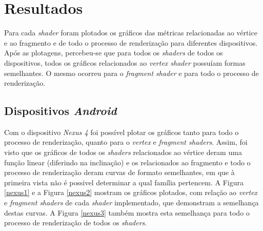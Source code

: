 \chapter[Resultados]{Resultados}
\label{result}

	Para cada \textit{shader} foram plotados os gráficos das métricas relacionadas ao vértice e ao fragmento e de todo o processo de renderização para diferentes dispositivos. Após as plotagens, percebeu-se que para todos os \textit{shaders} de todos os dispositivos, todos os gráficos relacionados ao \textit{vertex shader} possuíam formas semelhantes. O mesmo ocorreu para o \textit{fragment shader} e para todo o processo de renderização.

\section{Dispositivos \textit{Android}} 

	Com o dispositivo \textit{Nexus 4} foi possível plotar os gráficos tanto para todo o processo de renderização, quanto para o \textit{vertex} e \textit{fragment shaders}. Assim, foi visto que os gráficos de todos os \textit{shaders} relacionados ao vértice deram uma função linear (diferindo na inclinação)  e os relacionados ao fragmento e todo o processo de renderização deram curvas de formato semelhantes, em que à primeira vista não é possivel determinar a qual família pertencem.  A Figura \ref{nexus1} e a Figura \ref{nexus2} mostram os gráficos plotados, com relação ao \textit{vertex} e \textit{fragment shaders} de cada \textit{shader} implementado, que demonstram a semelhança destas curvas. A Figura \ref{nexus3} também mostra esta semelhança para todo o processo de renderização de todos os \textit{shaders}.

